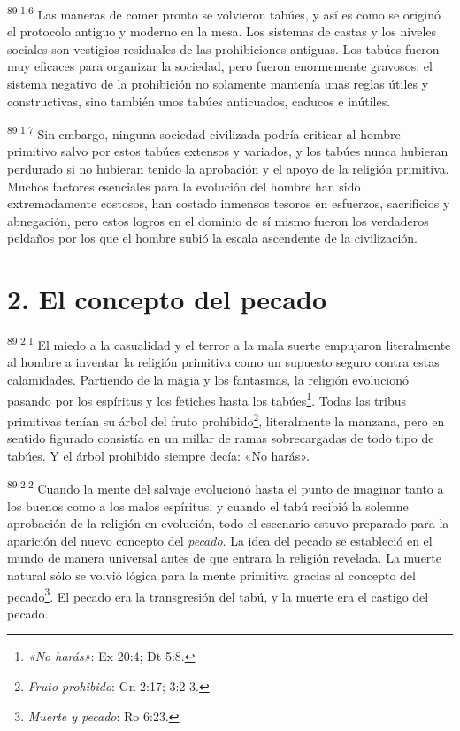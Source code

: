 \par
\textsuperscript{89:1.6} Las maneras de comer pronto se volvieron tabúes, y así es como se originó el protocolo antiguo y moderno en la mesa. Los sistemas de castas y los niveles sociales son vestigios residuales de las prohibiciones antiguas. Los tabúes fueron muy eficaces para organizar la sociedad, pero fueron enormemente gravosos; el sistema negativo de la prohibición no solamente mantenía unas reglas útiles y constructivas, sino también unos tabúes anticuados, caducos e inútiles.

\par
\textsuperscript{89:1.7} Sin embargo, ninguna sociedad civilizada podría criticar al hombre primitivo salvo por estos tabúes extensos y variados, y los tabúes nunca hubieran perdurado si no hubieran tenido la aprobación y el apoyo de la religión primitiva. Muchos factores esenciales para la evolución del hombre han sido extremadamente costosos, han costado inmensos tesoros en esfuerzos, sacrificios y abnegación, pero estos logros en el dominio de sí mismo fueron los verdaderos peldaños por los que el hombre subió la escala ascendente de la civilización.

\section*{2. El concepto del pecado}
\par
\textsuperscript{89:2.1} El miedo a la casualidad y el terror a la mala suerte empujaron literalmente al hombre a inventar la religión primitiva como un supuesto seguro contra estas calamidades. Partiendo de la magia y los fantasmas, la religión evolucionó pasando por los espíritus y los fetiches hasta los tabúes\footnote{\textit{«No harás»}: Ex 20:4; Dt 5:8.}. Todas las tribus primitivas tenían su árbol del fruto prohibido\footnote{\textit{Fruto prohibido}: Gn 2:17; 3:2-3.}, literalmente la manzana, pero en sentido figurado consistía en un millar de ramas sobrecargadas de todo tipo de tabúes. Y el árbol prohibido siempre decía: «No harás».

\par
\textsuperscript{89:2.2} Cuando la mente del salvaje evolucionó hasta el punto de imaginar tanto a los buenos como a los malos espíritus, y cuando el tabú recibió la solemne aprobación de la religión en evolución, todo el escenario estuvo preparado para la aparición del nuevo concepto del \textit{pecado}. La idea del pecado se estableció en el mundo de manera universal antes de que entrara la religión revelada. La muerte natural sólo se volvió lógica para la mente primitiva gracias al concepto del pecado\footnote{\textit{Muerte y pecado}: Ro 6:23.}. El pecado era la transgresión del tabú, y la muerte era el castigo del pecado.

